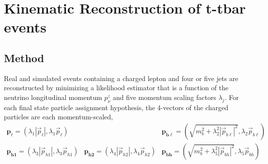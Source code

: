 \clearpage

\section{Kinematic Reconstruction of t-tbar events}

\subsection{Method}
\label{sec:reconstruction}

Real and simulated events containing a charged lepton and four or five jets are reconstructed by minimizing a likelihood estimator that is a function of the neutrino longitudinal momentum $p_\nu^z$ and five momentum scaling factors $\lambda_j$.  For each final state particle assignment hypothesis, the 4-vectors of the charged particles are each momentum-scaled,
\begin{equation}
\begin{array}{lll}
\boldsymbol{p_\ell} = \left(\lambda_1|\vec p_\ell |, \lambda_1\vec p_\ell\right) & &
\boldsymbol{p_{b\ell}} = \left(\sqrt{m_b^2+\lambda_2^2|\vec p_{b\ell}|^2}, \lambda_2\vec p_{b\ell}\right)  \\
\boldsymbol{p_{h1}} = \left(\lambda_3|\vec p_{h1} |, \lambda_3\vec p_{h1}\right) &
\boldsymbol{p_{h2}} = \left(\lambda_4|\vec p_{h2} |, \lambda_4\vec p_{h2}\right) &
\boldsymbol{p_{bh}} = \left(\sqrt{m_b^2+\lambda_5^2|\vec p_{bh}|^2}, \lambda_5\vec p_{bh}\right)
\end{array}
\end{equation}

